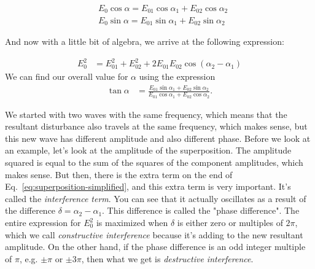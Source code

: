 \begin{equation}
\begin{aligned}
&E_{0} \cos \alpha=E_{01} \cos \alpha_{1}+E_{02} \cos \alpha_{2} \\
&E_{0} \sin \alpha=E_{01} \sin \alpha_{1}+E_{02} \sin \alpha_{2}
\end{aligned}
\end{equation}

And now with a little bit of algebra, we arrive at the following expression:

\begin{equation}
\begin{aligned}
E_{0}^{2} &=E_{01}^{2}+E_{02}^{2}+2 E_{01} E_{02} \cos \left(\alpha_{2}-\alpha_{1}\right)
\end{aligned}
\label{eq:superposition-simplified}
\end{equation}
We can find our overall value for $\alpha$ using the expression
\begin{equation}
\begin{aligned}
\tan \alpha &=\frac{E_{01} \sin \alpha_{1}+E_{02} \sin \alpha_{2}}{E_{01} \cos \alpha_{1}+E_{02} \cos \alpha_{2}}.
\end{aligned}
\label{eq:superposition-alpha}
\end{equation}


We started with two waves with the same frequency, which means that the resultant disturbance also travels at the same frequency, which makes sense, but this new wave has different amplitude and also different phase. Before we look at an example, let's look at the amplitude of the superposition. The amplitude squared is equal to the sum of the squares of the component amplitudes, which makes sense. But then, there is the extra term on the end of Eq.~\ref{eq:superposition-simplified}, and this extra term is very important. It's called the \emph{interference term}. You can see that it actually oscillates as a result of the difference $\delta = \alpha_2 - \alpha_1$. This difference is called the "phase difference". The entire expression for $E_0^2$ is maximized when $\delta$ is either zero or multiples of $2\pi$, which we call \emph{constructive interference} because it's adding to the new resultant amplitude. On the other hand, if the phase difference is an odd integer multiple of $\pi$, e.g. $\pm\pi$ or $\pm 3\pi$, then what we get is \emph{destructive interference}.

